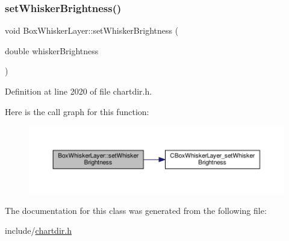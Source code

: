 \subsubsection{\texorpdfstring{set\+Whisker\+Brightness()}{setWhiskerBrightness()}}
{\footnotesize\ttfamily void Box\+Whisker\+Layer\+::set\+Whisker\+Brightness (\begin{DoxyParamCaption}\item[{double}]{whisker\+Brightness }\end{DoxyParamCaption})\hspace{0.3cm}{\ttfamily [inline]}}



Definition at line 2020 of file chartdir.\+h.

Here is the call graph for this function\+:
\nopagebreak
\begin{figure}[H]
\begin{center}
\leavevmode
\includegraphics[width=350pt]{class_box_whisker_layer_a352ca63547e3faaa3491ba955ce64ea8_cgraph}
\end{center}
\end{figure}


The documentation for this class was generated from the following file\+:\begin{DoxyCompactItemize}
\item 
include/\hyperlink{chartdir_8h}{chartdir.\+h}\end{DoxyCompactItemize}
